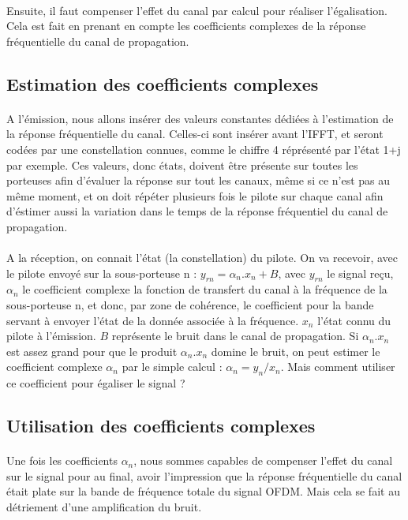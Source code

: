 \paragraph{}
Ensuite, il faut compenser l'effet du canal par calcul pour réaliser l'égalisation. Cela est fait en prenant en compte les coefficients complexes de la réponse fréquentielle du canal de propagation.

\subsection{Estimation des coefficients complexes}
\paragraph{}
A l'émission, nous allons insérer des valeurs constantes dédiées à l'estimation de la réponse fréquentielle du canal. Celles-ci sont insérer avant l'IFFT, et seront codées par une constellation connues, comme le chiffre 4 réprésenté par l'état 1+j par exemple. Ces valeurs, donc états, doivent être présente sur toutes les porteuses afin d'évaluer la réponse sur tout les canaux, même si ce n'est pas au même moment, et on doit répéter plusieurs fois le pilote sur chaque canal afin d'éstimer aussi la variation dans le temps de la réponse fréquentiel du canal de propagation.

\paragraph{}
A la réception, on connait l'état (la constellation) du pilote. On va recevoir, avec le pilote envoyé sur la sous-porteuse n : $y_{rn}=\alpha_n.x_n+B$, avec $y_{rn}$ le signal reçu, $\alpha_n$ le coefficient complexe la fonction de transfert du canal à la fréquence de la sous-porteuse n, et donc, par zone de cohérence, le coefficient pour la bande servant à envoyer l'état de la donnée associée à la fréquence. $x_n$ l'état connu du pilote à l'émission. $B$ représente le bruit dans le canal de propagation. Si $\alpha_n.x_n$ est assez grand pour que le produit $\alpha_n.x_n$ domine le bruit, on peut estimer le coefficient complexe $\alpha_n$ par le simple calcul : $\alpha_n=y_n/x_n$. Mais comment utiliser ce coefficient pour égaliser le signal ? 

\subsection{Utilisation des coefficients complexes}
\paragraph{}
Une fois les coefficients $\alpha_n$, nous sommes capables de compenser l'effet du canal sur le signal pour au final, avoir l'impression que la réponse fréquentielle du canal était plate sur la bande de fréquence totale du signal OFDM. Mais cela se fait au détriement d'une amplification du bruit.

